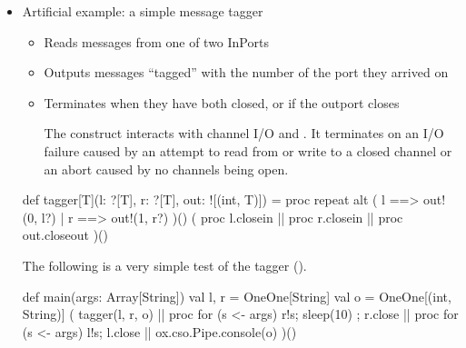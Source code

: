 \documentclass{concdistfoils}
\begin{document}
\begin{slide}
\begin{itemize}
\item Artificial example: a simple message tagger
\begin{smaller}
\begin{itemize}
\item Reads messages from one of two InPorts
\item Outputs messages ``tagged'' with the number of the port they arrived on
\item Terminates when they have both closed, or if the outport closes
\begin{note}
The  construct interacts with channel I/O and .
It terminates on an I/O failure caused by an attempt to read from or write to
a closed channel or an  abort caused by no channels being open.
\end{note}
\end{itemize}
\end{smaller}
\vfill
\begin{hideobj}{csoexamples/Tagger}
package csoexamples

object Tagger
{ import ox.CSO._
  
\end{hideobj}
\begin{obj}{}
  def tagger[T](l: ?[T], r: ?[T], out: ![(int, T)]) = proc
  { repeat
    {    alt ( l  ==> { out!(0, l?) }
             | r  ==> { out!(1, r?) }
             )()
    }
    ( proc {l.closein} || proc {r.closein} || proc {out.closeout} )()  
  }
\end{obj}
\begin{note} 
The following is a very simple test of the tagger ().

\begin{obj}{}
  def main(args: Array[String])
  { val l, r = OneOne[String]
    val o    = OneOne[(int, String)]
    (  tagger(l, r, o)
    || proc { for (s <- args) { r!s; sleep(10) }; r.close }
    || proc { for (s <- args) l!s; l.close }
    || ox.cso.Pipe.console(o)
    )()
  }
\end{obj}
\end{note}
\begin{hideobj}{}
}
\end{hideobj}
\end{itemize}
\end{slide}
\end{document}
